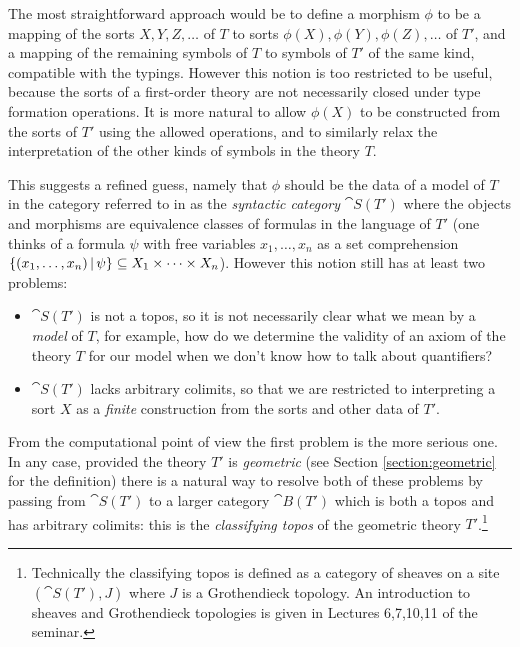 \documentclass[english,letter paper,12pt,reqno]{article}
\theoremstyle{example}
\begin{document}
The most straightforward approach would be to define a morphism $\phi$ to be a mapping of the sorts $X,Y,Z,\ldots$ of $T$ to sorts $\phi(X), \phi(Y), \phi(Z),\ldots$ of $T'$, and a mapping of the remaining symbols of $T$ to symbols of $T'$ of the same kind, compatible with the typings. However this notion is too restricted to be useful, because the sorts of a first-order theory are not necessarily closed under type formation operations. It is more natural to allow $\phi(X)$ to be constructed from the sorts of $T'$ using the allowed operations, and to similarly relax the interpretation of the other kinds of symbols in the theory $T$.

This suggests a refined guess, namely that $\phi$ should be the data of a model of $T$ in the category referred to in \cite{topos} as the \emph{syntactic category} $\cat{S}(T')$ where the objects and morphisms are equivalence classes of formulas in the language of $T'$ (one thinks of a formula $\psi$ with free variables $x_1,\ldots,x_n$ as a set comprehension $\{ (x_1,\ldots,x_n) \,|\, \psi \} \subseteq X_1 \times \cdots \times X_n$). However this notion still has at least two problems:
\begin{itemize}
\item $\cat{S}(T')$ is not a topos, so it is not necessarily clear what we mean by a \emph{model} of $T$, for example, how do we determine the validity of an axiom of the theory $T$ for our model when we don't know how to talk about quantifiers?
\item $\cat{S}(T')$ lacks arbitrary colimits, so that we are restricted to interpreting a sort $X$ as a \emph{finite} construction from the sorts and other data of $T'$.
\end{itemize}
From the computational point of view the first problem is the more serious one. In any case, provided the theory $T'$ is \emph{geometric} (see Section \ref{section:geometric} for the definition) there is a natural way to resolve both of these problems by passing from $\cat{S}(T')$ to a larger category $\cat{B}(T')$ which is both a topos and has arbitrary colimits: this is the \emph{classifying topos} of the geometric theory $T'$.\footnote{Technically the classifying topos is defined as a category of sheaves on a site $(\cat{S}(T'), J)$ where $J$ is a Grothendieck topology. An introduction to sheaves and Grothendieck topologies is given in Lectures 6,7,10,11 of the seminar.}
\end{document}
